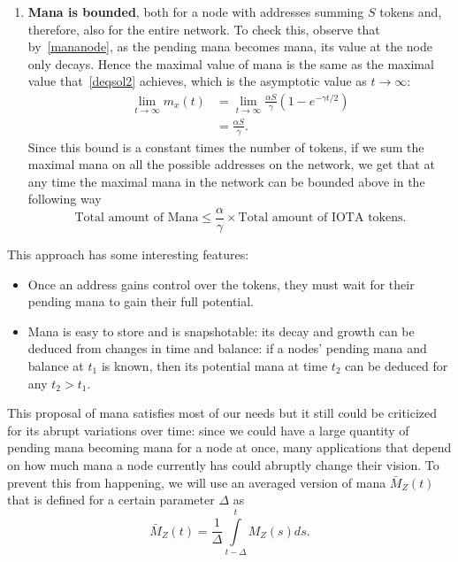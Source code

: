 \documentclass[../main.tex]{subfiles}
\begin{document}
\begin{enumerate}
    \item \textbf{Mana is bounded}, both for a node with addresses summing $S$ tokens and, therefore, also for the entire network. 
    To check this, observe that by~\eqref{mananode}, as the pending mana becomes mana, its value at the node only decays. Hence the maximal value of mana is the same as the maximal value that~\eqref{deqsol2} achieves, which is the asymptotic value as $t\to \infty$:
    \begin{align*}
    \lim \limits_{t\to \infty} m_x(t)&=\lim \limits_{t\to \infty}\frac{\alpha S}{\gamma}(1-e^{-\gamma t/2})\\
    &=\frac{\alpha S}{\gamma}.
    \end{align*}
    Since this bound is a constant times the number of tokens, if we sum the maximal mana on all the possible addresses on the network, we get that at any time the maximal mana in the network 
    can be bounded above in the following way
\begin{equation}
\label{eq_total_mana}
        \text{Total amount of  Mana}
    \leq \frac{\alpha}{\gamma} \times \text{Total
    amount of IOTA tokens}.
\end{equation}
\end{enumerate}


This approach has some interesting features:
\begin{itemize}
    \item Once an address gains control over the tokens, they must wait for their pending mana to gain their full potential.
    \item Mana is easy to store and is snapshotable: its decay and growth can be deduced from changes in time and balance: if a nodes' pending mana and balance at $t_1$ is known, then its potential mana at time $t_2$ can be deduced for any $t_2>t_1$.  
\end{itemize}


This proposal of mana satisfies most of our needs but it still could be criticized for its abrupt variations over time: since we could have a large quantity of pending mana becoming mana for a node at once, many applications that depend on how much mana a node currently has could abruptly change their vision. To prevent this from happening, we will use an averaged version of mana $\bar{M}_Z(t)$ that is defined for a certain parameter $\Delta$ as 
\begin{equation}
    \label{MAmana} \bar{M}_Z(t)=\frac{1}{\Delta}\int \limits_{t-\Delta}^t M_Z(s) ds.
\end{equation}
\end{document}
